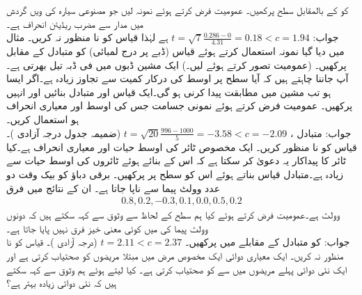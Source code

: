\quad
{} کو  کے بالمقابل سطح  پرکھیں۔ عمومیت فرض کرتے ہوئے نمونہ  لیں جو مصنوعی سیارہ  کی  ویں گردش میں مدار سے مضرب  ریڈیئن انحراف ہے۔\\
جواب:\quad
$t=\sqrt{7}\tfrac{0.286-0}{4.31}=0.18<c=1.94$
ہے لہٰذا قیاس کو نا منظور نہ کریں۔
\quad
مثال  میں دیا گیا نمونہ استعمال کرتے ہوئے قیاس  (ڈبے پر درج لمبائی) کو متبادل  کے مقابل پرکھیں۔ (عمومیت تصور کرتے ہوئے  لیں۔)
\quad
ایک مشین ڈبوں میں فی ڈبہ  تیل بھرتی ہے۔آپ جاننا چاہتے ہیں کہ آیا  سطح پر اوسط کی درکار کمیت  سے  تجاوز زیادہ ہے۔اگر ایسا ہو تب مشین میں مطابقت پیدا کرنی ہو گی۔ایک قیاس اور متبادل  بنائیں اور انہیں پرکھیں۔ عمومیت فرض کرتے ہوئے نمونی جسامت  جس کی  اوسط  اور معیاری انحراف   ہو استعمال کریں۔\\
جواب:\quad
متبادل ،
$t=\sqrt{20}\tfrac{996-1000}{5}=-3.58<c=-2.09$
(ضمیمہ  جدول   درجہ آزادی )۔ قیاس  کو نا منظور کریں۔
\quad
ایک مخصوص ٹائر کی اوسط حیات   اور معیاری انحراف  ہے۔کیا ٹائر کا پیداکار یہ دعویٰ کر سکتا ہے کہ اس کے بنائے ہوئے ٹائروں کی اوسط حیات  سے زیادہ ہے۔متبادل قیاس بناتے ہوئے اس کو  سطح پر پرکھیں۔
\quad
برقی دباؤ کو بیک وقت دو عدد وولٹ پیما سے ناپا جاتا ہے۔ ان کے نتائج میں فرق 
\begin{align*}
0.8,0.2,-0.3,0.1,0.0,0.5,0.2
\end{align*}
 وولٹ  ہے۔عمومیت فرض کرتے ہوئے کیا ہم  سطح کے لحاظ سے وثوق سے کہہ سکتے ہیں کہ دونوں وولٹ پیما کی  میں کوئی معنی خیز فرق نہیں پایا جاتا ہے۔\\
جواب:\quad
{} کو متبادل  کے مقابلے میں پرکھیں۔
$t=2.11<c=2.37$
(درجہ آزادی )۔ قیاس کو نا منظور نہ کریں۔
\quad
ایک معیاری دوائی ایک مخصوص مرض  میں مبتلا  مریضوں کو صحتیاب کرتی ہے اور ایک نئی دوائی پہلے  مریضوں میں سے  کو صحتیاب کرتی ہے۔  کیا  لیتے ہوئے ہم وثوق سے کہہ سکتے ہیں کہ نئی دوائی زیادہ بہتر ہے؟
